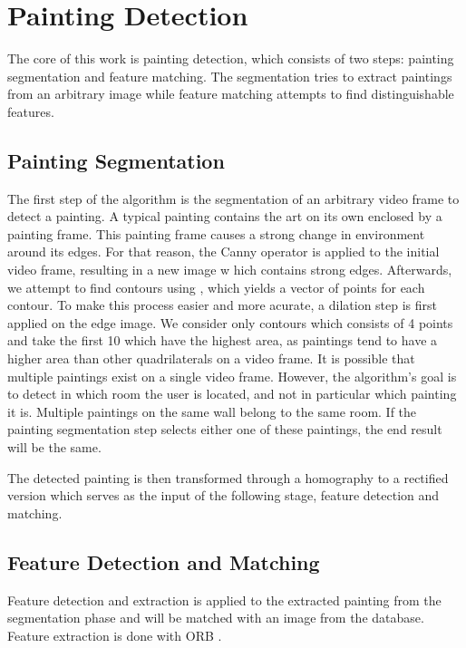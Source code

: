\section{Painting Detection}
\label{sec:painting_detection}
	The core of this work is painting detection, which consists of two steps: painting segmentation and feature matching. The segmentation tries to extract paintings from an arbitrary image while feature matching attempts to find distinguishable features.

	\subsection{Painting Segmentation}
	The first step of the algorithm is the segmentation of an arbitrary video frame to detect a painting. A typical painting contains the art on its own enclosed by a painting frame. This painting frame causes a strong change in environment around its edges. For that reason, the Canny operator \cite{Canny1986} is applied to the initial video frame, resulting in a new image w
	hich contains strong edges. Afterwards, we attempt to find contours using \cite{SUZUKI198532}, which yields a vector of points for each contour. To make this process easier and more acurate, a dilation step is first applied on the edge image. We consider only contours which consists of 4 points and take the first 10 which have the highest area, as paintings tend to have a higher area than other quadrilaterals on a video frame. It is possible that multiple paintings exist on a single video frame. However, the algorithm's goal is to detect in which room the user is located, and not in particular which painting it is. Multiple paintings on the same wall belong to the same room. If the painting segmentation step selects either one of these paintings, the end result will be the same. 
	

	The detected painting is then transformed through a homography to a rectified version which serves as the input of the following stage, feature detection and matching.

	\subsection{Feature Detection and Matching}
	
	
	Feature detection and extraction is applied to the extracted painting from the segmentation phase and will be matched with an image from the database. Feature extraction is done with ORB \cite{Rublee2011}.

